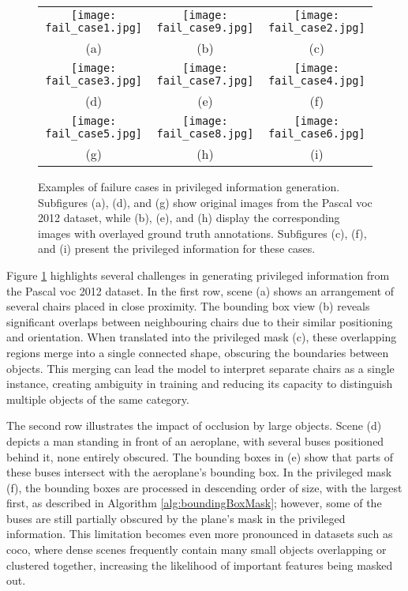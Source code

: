 \begin{figure}[!b]%
  \centering
  \begin{tabular}{ccc}
    \texttt{[image: fail\_case1.jpg]} &
    \texttt{[image: fail\_case9.jpg]} &
    \texttt{[image: fail\_case2.jpg]} \\
    \small (a) & \small (b) & \small (c) \\[1em]
    
    \texttt{[image: fail\_case3.jpg]} &
    \texttt{[image: fail\_case7.jpg]} &
    \texttt{[image: fail\_case4.jpg]} \\
    \small (d) & \small (e) & \small (f) \\[1em]
    
    \texttt{[image: fail\_case5.jpg]} &
    \texttt{[image: fail\_case8.jpg]} &
    \texttt{[image: fail\_case6.jpg]} \\
    \small (g) & \small (h) & \small (i) \\
  \end{tabular}
  \caption{Examples of failure cases in privileged information generation. Subfigures (a), (d), and (g) show original images from the Pascal \gls{voc} 2012 dataset, while (b), (e), and (h) display the corresponding images with overlayed ground truth annotations. Subfigures (c), (f), and (i) present the privileged information for these cases.}
  \label{fig:fail_cases}
\end{figure}

Figure \ref{fig:fail_cases} highlights several challenges in generating privileged information from the Pascal \gls{voc} 2012 dataset. In the first row, scene (a) shows an arrangement of several chairs placed in close proximity. The bounding box view (b) reveals significant overlaps between neighbouring chairs due to their similar positioning and orientation. When translated into the privileged mask (c), these overlapping regions merge into a single connected shape, obscuring the boundaries between objects. This merging can lead the model to interpret separate chairs as a single instance, creating ambiguity in training and reducing its capacity to distinguish multiple objects of the same category.

The second row illustrates the impact of occlusion by large objects. Scene (d) depicts a man standing in front of an aeroplane, with several buses positioned behind it, none entirely obscured. The bounding boxes in (e) show that parts of these buses intersect with the aeroplane’s bounding box. In the privileged mask (f), the bounding boxes are processed in descending order of size, with the largest first, as described in Algorithm \ref{alg:boundingBoxMask}; however, some of the buses are still partially obscured by the plane’s mask in the privileged information. This limitation becomes even more pronounced in datasets such as \gls{coco}, where dense scenes frequently contain many small objects overlapping or clustered together, increasing the likelihood of important features being masked out.

